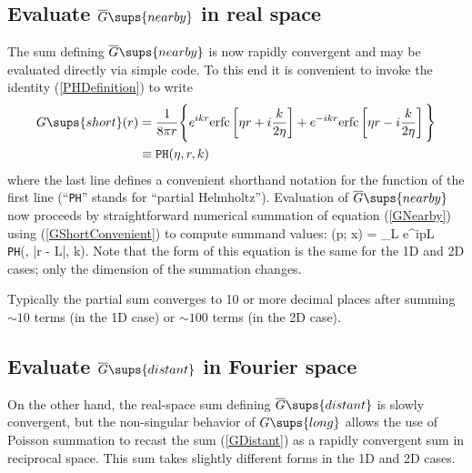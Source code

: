 \documentclass[letterpaper]{article}
\newcommand{\GB}{\overline{G}}
\newcommand{\erfc}{\text{erfc}}
\begin{document}
\subsection{Evaluate $\GB\sups{nearby}$ in real space}

The sum defining $\GB\sups{nearby}$ is now rapidly convergent
and may be evaluated directly via simple code. To this end
it is convenient to invoke the identity (\ref{PHDefinition})
to write
\begin{align}
  G\sups{short}(r)
&= \frac{1}{8\pi r}
     \Bigg\{ e^{ ikr} \erfc\left[  \eta r
                                 +i\frac{k}{2\eta}\right]
            +e^{-ikr} \erfc\left[ \eta r
                                 -i\frac{k}{2\eta}\right]
     \Bigg\}
\label{GShortConvenient} \\
&\equiv \texttt{PH}(\eta, r, k)
\end{align}
where the last line defines a convenient shorthand notation
for the function of the first line (``\texttt{PH}'' stands
for ``partial Helmholtz'').
Evaluation of $\GB\sups{nearby}$ now proceeds by straightforward
numerical summation of equation (\ref{GNearby}) using
(\ref{GShortConvenient}) to compute summand values: 
{
 \GB{}(\vb p; \vb x) = \sum_{\vb L} e^{i\vb p\cdot \vb L}
   \, \texttt{PH}\Big(\eta, |\vb r - \vb L|, k\Big).
}
Note that the form of this equation is the same for the 
1D and 2D cases; only the dimension of the summation 
changes.

Typically
the partial sum converges to 10 or more decimal places after
summing $\sim 10$ terms (in the 1D case) or $\sim 100$ terms
(in the 2D case).

\subsection{Evaluate $\GB\sups{distant}$ in Fourier space}

On the other hand, the real-space sum defining $\GB\sups{distant}$ 
is slowly convergent, but the non-singular behavior of $G\sups{long}$
allows the use of Poisson summation to recast the sum (\ref{GDistant}) 
as a rapidly convergent sum in reciprocal space. This sum takes
slightly different forms in the 1D and 2D cases.
\end{document}
